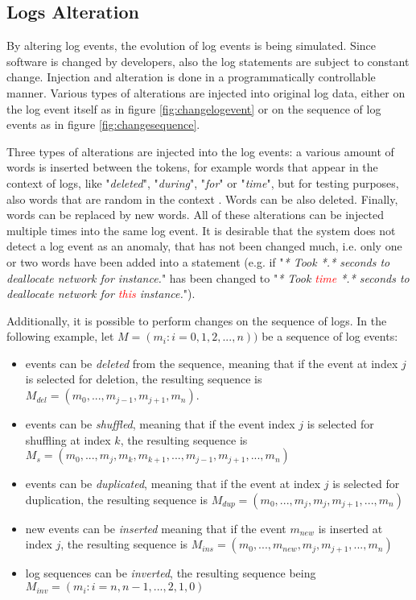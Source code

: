 \subsection{Logs Alteration\label{sec:logs_alteration}}
By altering log events, the evolution of log events is being simulated. Since software is changed by developers, also the log statements are subject to constant change. Injection and alteration is done in a programmatically controllable manner. Various types of alterations are injected into original log data, either on the log event itself as in figure \ref{fig:changelogevent} or on the sequence of log events as in figure \ref{fig:changesequence}. 

Three types of alterations are injected into the log events: a various amount of words is inserted between the tokens, for example words that appear in the context of logs, like "\textit{deleted}", "\textit{during}", "\textit{for}" or "\textit{time}", but for testing purposes, also words that are random in the context . Words can be also deleted. Finally, words can be replaced by new words. All of these alterations can be injected multiple times into the same log event. It is desirable that the system does not detect a log event as an anomaly, that has not been changed much, i.e. only one or two words have been added into a statement (e.g. if "\textit{* Took *.* seconds to deallocate network for instance.}" has been changed to "\textit{* Took \textcolor{red}{time} *.* seconds to deallocate network for \textcolor{red}{this} instance.}").

Additionally, it is possible to perform changes on the sequence of logs. In the following example, let $M = (m_i : i = 0, 1, 2, ..., n))$ be a sequence of log events:
\begin{itemize}
	\setlength\itemsep{-0.5em}
	\item events can be \textit{deleted} from the sequence, meaning that if the event at index $j$ is selected for deletion, the resulting sequence is $M_{del} = (m_0, ..., m_{j-1}, m_{j+1}, m_n)$.
	\item events can be \textit{shuffled}, meaning that if the event index $j$ is selected for shuffling at index $k$, the resulting sequence is $M_s = (m_0, ..., m_j, m_k, m_{k+1}, ..., m_{j-1}, m_{j+1}, ..., m_n)$
	\item events can be \textit{duplicated}, meaning that if the event at index $j$ is selected for duplication, the resulting sequence is $M_{dup} = (m_0, ..., m_j, m_j, m_{j+1}, ..., m_n)$
	\item new events can be \textit{inserted} meaning that if the event $m_{new}$ is inserted at index $j$, the resulting sequence is $M_{ins} = (m_0, ..., m_{new}, m_j, m_{j+1}, ..., m_n)$
	\item log sequences can be \textit{inverted}, the resulting sequence being $M_{inv} = (m_i : i = n, n-1, ..., 2, 1, 0)$
\end{itemize}

